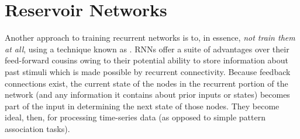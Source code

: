 \chapter{Reservoir Networks}\label{ch_reservoir}






Another approach to training recurrent networks is to, in essence, \emph{not train them at all}, using a technique known as . RNNs offer a suite of advantages over their feed-forward cousins owing to their potential ability to store information about past stimuli which is made possible by recurrent connectivity. Because feedback connections exist, the current state of the nodes in the recurrent portion of the network (and any information it contains about prior inputs or states) becomes part of the input in determining the next state of those nodes. They become ideal, then, for processing time-series data (as opposed to simple pattern association tasks). 

